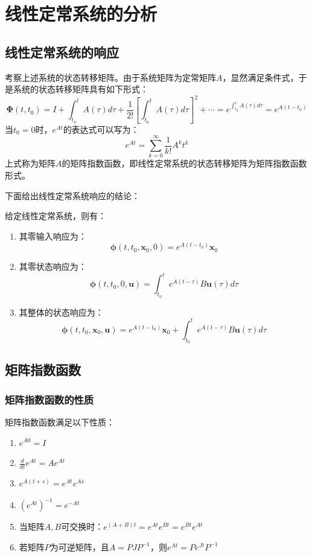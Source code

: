 \section{线性定常系统的分析}
\subsection{线性定常系统的响应}
考察上述系统的状态转移矩阵。由于系统矩阵为定常矩阵$A$，显然满足条件式，于是系统的状态转移矩阵具有如下形式：
\begin{equation*}
    \bm{\Phi}(t,t_0) = I +\int_{t_0}^t A(\tau) d\tau + \frac{1}{2!}[\int_{t_0}^t A(\tau) d\tau]^2 + \cdots = e^{\int_{t_0}^t A(\tau) d\tau} = e^{A(t-t_0)}
\end{equation*}
当$t_0 = 0$时，$e^{At}$的表达式可以写为：
\begin{equation*}
    e^{At} = \sum_{k=0}^\infty \frac{1}{k!} A^k t^k
\end{equation*}
上式称为矩阵$A$的矩阵指数函数，即线性定常系统的状态转移矩阵为矩阵指数函数形式。

下面给出线性定常系统响应的结论：
\begin{theorem}
    给定线性定常系统，则有：
    \begin{enumerate}
        \item 其零输入响应为：
        \begin{equation*}
            \bm{\phi}(t,t_0,\bm{x}_0,0) = e^{A(t-t_0)} \bm{x}_0
        \end{equation*}
        \item 其零状态响应为：
        \begin{equation*}
            \bm{\phi}(t,t_0,0,\bm{u}) = \int_{t_0}^t e^{A(t-\tau)} B \bm{u}(\tau) d\tau
        \end{equation*}
        \item 其整体的状态响应为：
        \begin{equation*}
            \bm{\phi}(t,t_0,\bm{x}_0,\bm{u}) = e^{A(t-t_0)} \bm{x}_0 + \int_{t_0}^t e^{A(t-\tau)} B \bm{u}(\tau) d\tau
        \end{equation*}
    \end{enumerate}
\end{theorem}

\subsection{矩阵指数函数}
\subsubsection{矩阵指数函数的性质}
矩阵指数函数满足以下性质：
\begin{enumerate}
    \item $e^{A0} = I$
    \item $\frac{d}{dt} e^{At} = A e^{At}$
    \item $e^{A(t+s)} = e^{At} e^{As}$
    \item $(e^{At})^{-1} = e^{-At}$
    \item 当矩阵$A,B$可交换时：$e^{(A+B)t} = e^{At} e^{Bt} = e^{Bt} e^{At}$
    \item 若矩阵$P$为可逆矩阵，且$A = PJP^{-1}$，则$e^{At} = P e^{Jt} P^{-1}$
\end{enumerate}
